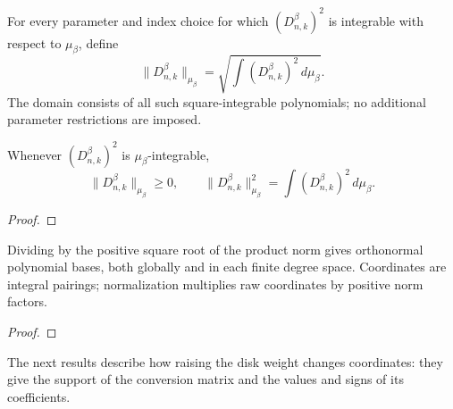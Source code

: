 \begin{supporting}
\begin{definition}
\label{def:dunkl-xu-norm}
\leanok
For every parameter and index choice for which $(D_{n,k}^{\beta})^2$ is
integrable with respect to $\mu_\beta$, define
\[
 \|D_{n,k}^{\beta}\|_{\mu_\beta}=\sqrt{\int (D_{n,k}^{\beta})^2\,d\mu_\beta}.
\]
The domain consists of all such square-integrable polynomials; no additional
parameter restrictions are imposed.
\end{definition}
\begin{theorem}
\label{thm:dunkl-xu-norm}
\leanok
Whenever $(D_{n,k}^{\beta})^2$ is $\mu_\beta$-integrable,
\[
 \|D_{n,k}^{\beta}\|_{\mu_\beta}\ge0,\qquad
 \|D_{n,k}^{\beta}\|_{\mu_\beta}^2=\int (D_{n,k}^{\beta})^2\,d\mu_\beta.
\]
\end{theorem}
\begin{proof}
\leanok
\end{proof}
\end{supporting}


\begin{theorem}
\label{thm:disk-normalization}
\leanok
Dividing by the positive square root of the product norm gives orthonormal
polynomial bases, both globally and in each finite degree space. Coordinates
are integral pairings; normalization multiplies raw coordinates by positive
norm factors.
\end{theorem}
\begin{proof}
\leanok
\end{proof}

The next results describe how raising the disk weight changes coordinates:
they give the support of the conversion matrix and the values and signs of
its coefficients.

